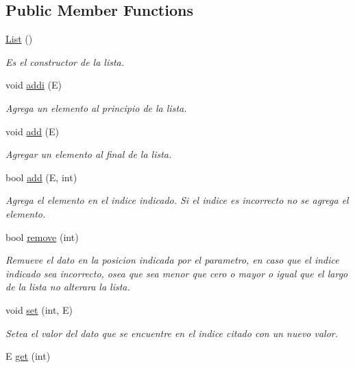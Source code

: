 \subsection*{Public Member Functions}
\begin{DoxyCompactItemize}
\item 
\hyperlink{class_list_ae47afd06bd8c39fe7a12d4489998e7c5}{List} ()
\begin{DoxyCompactList}\small\item\em Es el constructor de la lista. \end{DoxyCompactList}\item 
void \hyperlink{class_list_a4f0fb366c1153a4fd01826e9e6de5afc}{addi} (E)
\begin{DoxyCompactList}\small\item\em Agrega un elemento al principio de la lista. \end{DoxyCompactList}\item 
void \hyperlink{class_list_a2a130b7bc38cd968136f1f847e42d0cc}{add} (E)
\begin{DoxyCompactList}\small\item\em Agregar un elemento al final de la lista. \end{DoxyCompactList}\item 
bool \hyperlink{class_list_a530267346ebec244900c162de6f467e1}{add} (E, int)
\begin{DoxyCompactList}\small\item\em Agrega el elemento en el indice indicado. Si el indice es incorrecto no se agrega el elemento. \end{DoxyCompactList}\item 
bool \hyperlink{class_list_a46cec78299d3e23469276adf46adf9c1}{remove} (int)
\begin{DoxyCompactList}\small\item\em Remueve el dato en la posicion indicada por el parametro, en caso que el indice indicado sea incorrecto, osea que sea menor que cero o mayor o igual que el largo de la lista no alterara la lista. \end{DoxyCompactList}\item 
void \hyperlink{class_list_ac8b31be96806bd56f655436629ac2e7a}{set} (int, E)
\begin{DoxyCompactList}\small\item\em Setea el valor del dato que se encuentre en el indice citado con un nuevo valor. \end{DoxyCompactList}\item 
E \hyperlink{class_list_ab081a52d7a62aa6c5550ff9762f9427f}{get} (int)

\end{DoxyCompactItemize}
